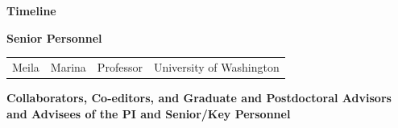 \documentclass[floatfix,11pt]{article}
\begin{document}
{\bf Timeline} 

\vspace{-2.1em}



\vspace{0.6em}


\vspace{0.6em}

\newpage
\centerline{\textbf{Senior Personnel}}
\begin{tabular}{llll}
Meila & Marina & Professor & University of Washington\\
\end{tabular}

\centerline{\textbf{Collaborators, Co-editors, and Graduate and Postdoctoral Advisors and Advisees of the PI and Senior/Key Personnel}}
\begin{tabular}{llll}

\end{tabular}
\end{document}
